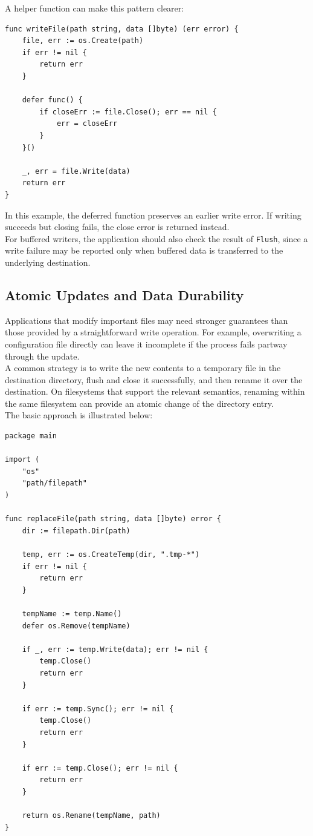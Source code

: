 A helper function can make this pattern clearer:

\begin{lstlisting}
func writeFile(path string, data []byte) (err error) {
    file, err := os.Create(path)
    if err != nil {
        return err
    }

    defer func() {
        if closeErr := file.Close(); err == nil {
            err = closeErr
        }
    }()

    _, err = file.Write(data)
    return err
}
\end{lstlisting}

In this example, the deferred function preserves an earlier write error. If writing succeeds but closing fails, the close error is returned instead.\\

For buffered writers, the application should also check the result of \texttt{Flush}, since a write failure may be reported only when buffered data is transferred to the underlying destination.\\

\subsection{Atomic Updates and Data Durability}

Applications that modify important files may need stronger guarantees than those provided by a straightforward write operation. For example, overwriting a configuration file directly can leave it incomplete if the process fails partway through the update.\\

A common strategy is to write the new contents to a temporary file in the destination directory, flush and close it successfully, and then rename it over the destination. On filesystems that support the relevant semantics, renaming within the same filesystem can provide an atomic change of the directory entry.\\

The basic approach is illustrated below:

\begin{lstlisting}
package main

import (
    "os"
    "path/filepath"
)

func replaceFile(path string, data []byte) error {
    dir := filepath.Dir(path)

    temp, err := os.CreateTemp(dir, ".tmp-*")
    if err != nil {
        return err
    }

    tempName := temp.Name()
    defer os.Remove(tempName)

    if _, err := temp.Write(data); err != nil {
        temp.Close()
        return err
    }

    if err := temp.Sync(); err != nil {
        temp.Close()
        return err
    }

    if err := temp.Close(); err != nil {
        return err
    }

    return os.Rename(tempName, path)
}
\end{lstlisting}

